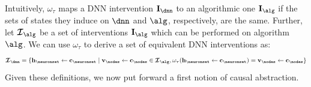 \documentclass{article}
\newcommand{\nodesvalues}{\mathbf{v}}
\newcommand{\hiddenstates}{\mathbf{h}}
\newcommand{\abstractionmap}{\tau}
\newcommand{\interventionsset}{\boldsymbol{\mathcal{I}}}
\newcommand{\interventionmap}{\omega_{\abstractionmap}}
\begin{document}
Intuitively, $\interventionmap$ maps a DNN intervention $\interventionsdnn$ to an algorithmic one $\interventionsalg$ if the sets of states they induce on $\dnn$ and $\alg$, respectively, are the same.
Further, let $\interventionsset_{\alg}$ be a set of interventions $\interventionsalg$ 
which can be performed on algorithm $\alg$.
We can use $\interventionmap$ to derive a set of equivalent DNN interventions as:
\begin{align}
    \interventionsset_{\dnn} = \{
    \hiddenstates_{\neuronset} \leftarrow \constants_{\neuronset} \mid
    \nodesvalues_{\nodes} \leftarrow \constants_{\nodes} \in \interventionsset_{\alg}, 
    \omega_{\abstractionmap}(\hiddenstates_{\neuronset} \leftarrow \constants_{\neuronset}) = \nodesvalues_{\nodes} \leftarrow \constants_{\nodes}\}
\end{align}
Given these definitions, we now put forward a first notion of causal abstraction.
\end{document}
